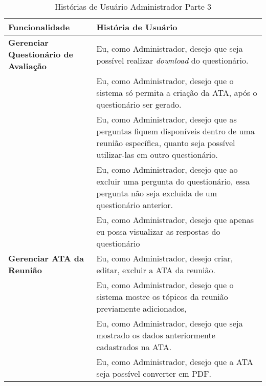\begin{table}[H]
	\begin{tabular}{|p{5.0cm}|p{10.0cm}|} 
	\hline
	\textbf{Funcionalidade} & \textbf{História de Usuário} \\ \hline
	\textbf{Gerenciar Questionário de Avaliação} & Eu, como Administrador, desejo que seja possível realizar \textit{download} do questionário. \\ \hline
	& Eu, como Administrador, desejo que o sistema só permita a criação da ATA, após o questionário ser gerado. \\ \hline
	& Eu, como Administrador, desejo que as perguntas fiquem disponíveis dentro de uma reunião específica, quanto seja possível utilizar-las em outro questionário. \\ \hline
	& Eu, como Administrador, desejo que ao excluir uma pergunta do questionário, essa pergunta não seja excluida de um questionário anterior. \\ \hline
	& Eu, como Administrador, desejo que apenas eu possa visualizar as respostas do questionário \\ \hline
	\textbf{Gerenciar ATA da Reunião} & Eu, como Administrador, desejo criar, editar, excluir a ATA da reunião.\\ \hline
	& Eu, como Administrador, desejo que o sistema mostre os tópicos da reunião previamente adicionados, \\ \hline
	& Eu, como Administrador, desejo que seja mostrado os dados anteriormente cadastrados na ATA. \\ \hline
	& Eu, como Administrador, desejo que a ATA seja possível converter em PDF. \\ \hline
	\end{tabular}
	 \caption{Histórias de Usuário Administrador Parte 3}
	 \label{tab:historias_de_usuario_administrador_parte3}
\end{table}

